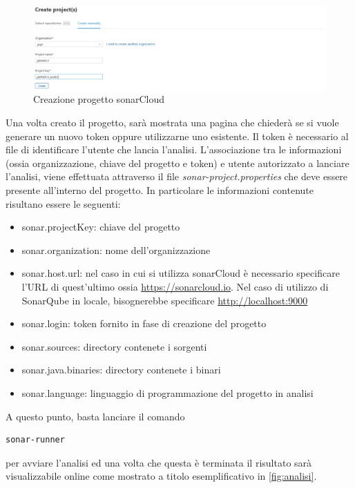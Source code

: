 \begin{figure}[htbp]
	\centering
	\includegraphics[scale=0.3, trim = 0cm 0cm 0cm 0cm, clip=true]{figSonarCloud/progetto.PNG}
	\caption{Creazione progetto sonarCloud}
	\label{fig:prog}
\end{figure}
Una volta creato il progetto, sarà mostrata una pagina che chiederà se si vuole generare un nuovo token oppure utilizzarne uno esistente. Il token è necessario al file di identificare l'utente che lancia l'analisi. L'associazione tra le informazioni (ossia organizzazione, chiave del progetto e token) e utente autorizzato a lanciare l'analisi, viene effettuata attraverso il file \textit{sonar-project.properties} che deve essere presente all'interno del progetto. In particolare le informazioni contenute risultano essere le seguenti:
\begin{itemize}
	\item 	sonar.projectKey: chiave del progetto
	\item 	sonar.organization: nome dell'organizzazione
	\item 	sonar.host.url: nel caso in cui si utilizza sonarCloud è necessario specificare l'URL di quest'ultimo ossia \url{https://sonarcloud.io}. Nel caso di utilizzo di SonarQube in locale, bisognerebbe specificare \url{http://localhost:9000}
	\item 	sonar.login: token fornito in fase di creazione del progetto
	\item sonar.sources: directory contenete i sorgenti
	\item sonar.java.binaries: directory contenete i binari
	\item sonar.language: linguaggio di programmazione del progetto in analisi
\end{itemize}

A questo punto, basta lanciare il comando 
\begin{verbatim}
sonar-runner
\end{verbatim}
per avviare l'analisi ed una volta che questa è terminata il risultato sarà visualizzabile online come mostrato a titolo esemplificativo in \autoref{fig:analisi}.
	
